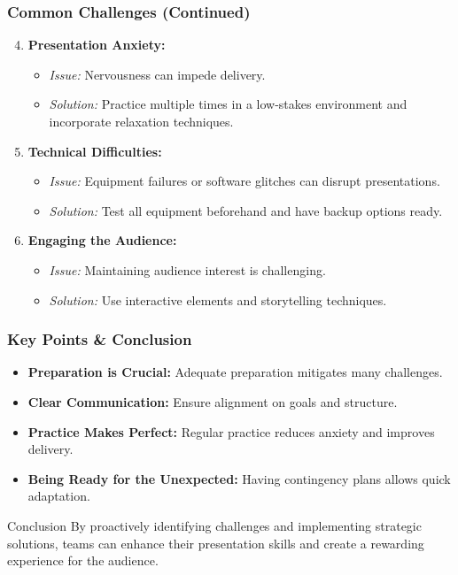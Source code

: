 \documentclass[aspectratio=169]{beamer}
\begin{document}
\begin{frame}[fragile]
    \frametitle{Common Challenges (Continued)}
    \begin{enumerate}
        \setcounter{enumi}{3} %
        \item \textbf{Presentation Anxiety:}
            \begin{itemize}
                \item \textit{Issue:} Nervousness can impede delivery.
                \item \textit{Solution:} Practice multiple times in a low-stakes environment and incorporate relaxation techniques.
            \end{itemize}
        
        \item \textbf{Technical Difficulties:}
            \begin{itemize}
                \item \textit{Issue:} Equipment failures or software glitches can disrupt presentations.
                \item \textit{Solution:} Test all equipment beforehand and have backup options ready.
            \end{itemize}
        
        \item \textbf{Engaging the Audience:}
            \begin{itemize}
                \item \textit{Issue:} Maintaining audience interest is challenging.
                \item \textit{Solution:} Use interactive elements and storytelling techniques.
            \end{itemize}
    \end{enumerate}
\end{frame}

\begin{frame}[fragile]
    \frametitle{Key Points & Conclusion}
    \begin{itemize}
        \item \textbf{Preparation is Crucial:} Adequate preparation mitigates many challenges.
        \item \textbf{Clear Communication:} Ensure alignment on goals and structure.
        \item \textbf{Practice Makes Perfect:} Regular practice reduces anxiety and improves delivery.
        \item \textbf{Being Ready for the Unexpected:} Having contingency plans allows quick adaptation.
    \end{itemize}
    
    \begin{block}{Conclusion}
        By proactively identifying challenges and implementing strategic solutions, teams can enhance their presentation skills and create a rewarding experience for the audience.
    \end{block}
\end{frame}
\end{document}
